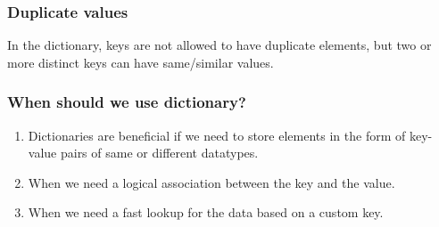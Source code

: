 \documentclass[11pt]{article}
\providecommand{\tightlist}{%
      \setlength{\itemsep}{0pt}\setlength{\parskip}{0pt}}
\begin{document}
    \hypertarget{duplicate-values}{%
\subsubsection{Duplicate values}\label{duplicate-values}}

In the dictionary, keys are not allowed to have duplicate elements, but
two or more distinct keys can have same/similar values.

    \hypertarget{when-should-we-use-dictionary}{%
\subsubsection{When should we use
dictionary?}\label{when-should-we-use-dictionary}}

\begin{enumerate}
\def\labelenumi{\arabic{enumi}.}
\tightlist
\item
  Dictionaries are beneficial if we need to store elements in the form
  of key-value pairs of same or different datatypes.
\item
  When we need a logical association between the key and the value.
\item
  When we need a fast lookup for the data based on a custom key.
\end{enumerate}


    
    
    
\end{document}
